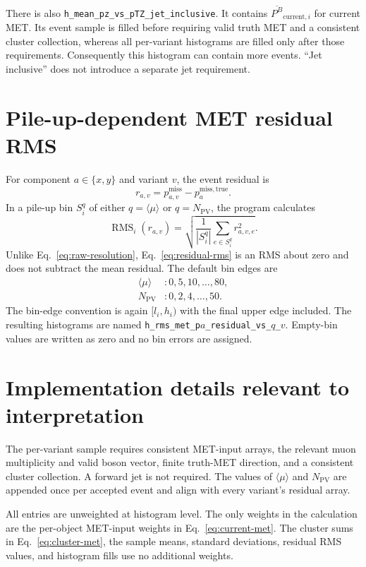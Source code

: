 \documentclass[11pt,a4paper]{article}
\newcommand{\avgmu}{\langle\mu\rangle}
\begin{document}
There is also
\texttt{h\_mean\_pz\_vs\_pTZ\_jet\_inclusive}.  It contains
$\overline{P^B}_{\mathrm{current},i}$ for current MET.  Its event sample is
filled before requiring valid truth MET and a consistent cluster collection,
whereas all per-variant histograms are filled only after those requirements.
Consequently this histogram can contain more events.  ``Jet inclusive'' does
not introduce a separate jet requirement.

\section{Pile-up-dependent MET residual RMS}

For component $a\in\{x,y\}$ and variant $v$, the event residual is
\begin{equation}
  r_{a,v}=p^{\mathrm{miss}}_{a,v}
          -p^{\mathrm{miss,true}}_a.
\end{equation}
In a pile-up bin $S_i^{q}$ of either $q=\avgmu$ or $q=N_{\mathrm{PV}}$, the
program calculates
\begin{equation}
  \operatorname{RMS}_{i}(r_{a,v})
  =\sqrt{\frac{1}{|S_i^q|}\sum_{e\in S_i^q}r_{a,v,e}^{2}}.
  \label{eq:residual-rms}
\end{equation}
Unlike Eq.~\eqref{eq:raw-resolution}, Eq.~\eqref{eq:residual-rms} is an RMS
about zero and does not subtract the mean residual.  The default bin edges are
\begin{align}
  \avgmu &: 0,5,10,\ldots,80,\\
  N_{\mathrm{PV}} &: 0,2,4,\ldots,50.
\end{align}
The bin-edge convention is again $[l_i,h_i)$ with the final upper edge
included.  The resulting histograms are named
\texttt{h\_rms\_met\_p\(a\)\_residual\_vs\_\(q\)\_\(v\)}.  Empty-bin
values are written as zero and no bin errors are assigned.

\section{Implementation details relevant to interpretation}

The per-variant sample requires consistent MET-input arrays, the relevant
muon multiplicity and valid boson vector, finite truth-MET direction, and a
consistent cluster collection.  A forward jet is not required.  The values of
$\avgmu$ and $N_{\mathrm{PV}}$ are appended once per accepted event and align
with every variant's residual array.

All entries are unweighted at histogram level.  The only weights in the
calculation are the per-object MET-input weights in
Eq.~\eqref{eq:current-met}.  The cluster sums in
Eq.~\eqref{eq:cluster-met}, the sample means, standard deviations, residual
RMS values, and histogram fills use no additional weights.
\end{document}
